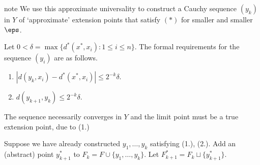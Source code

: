 \documentclass[letterpaper,10pt,english]{jupyterBook}
\begin{document}
\begin{sphinxadmonition}{note}
\sphinxAtStartPar
We use this approximate universality to construct a Cauchy sequence \((y_k)\) in \(Y\) of ‘approximate’ extension points that satisfy \((*)\) for smaller and smaller \(\eps\).

\sphinxAtStartPar
Let \(0 < \delta = \max \{d^*(x^*,x_i) \colon 1 \leq i \leq n \}\).
The formal requirements for the sequence \((y_i)\) are as follows.
\begin{enumerate}
%
\item {} 
\sphinxAtStartPar
\(|d(y_k,x_i) - d^*(x^*,x_i)| \leq 2^{-k} \delta\).

\item {} 
\sphinxAtStartPar
\(d(y_{k+1},y_k) \leq 2^{-k}\delta\).

\end{enumerate}

\sphinxAtStartPar
The sequence necessarily converges in \(Y\) and the limit point must be a true extension point, due to (1.)

\sphinxAtStartPar
Suppose we have already constructed \(y_1, \dots, y_k\) satisfying (1.), (2.). Add an (abstract) point \(y^*_{k+1}\) to \(F_k = F \cup \{y_1, \dots, y_k\}\). Let \(F^*_{k+1} = F_k \sqcup \{y^*_{k+1}\}\).


\end{sphinxadmonition}
\end{document}
